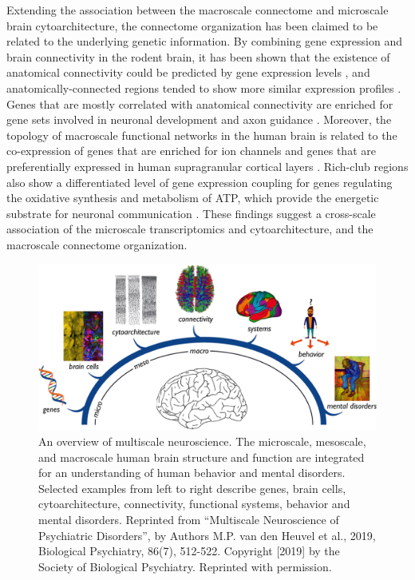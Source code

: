 \begin{refsection}
Extending the association between the macroscale connectome and microscale brain cytoarchitecture, the connectome organization has been claimed to be related to the underlying genetic information. By combining gene expression and brain connectivity in the rodent brain, it has been shown that the existence of anatomical connectivity could be predicted by gene expression levels \citep{Wolf2011GeneEI}, and anatomically-connected regions tended to show more similar expression profiles \citep{French2011RelationshipsBG}. Genes that are mostly correlated with anatomical connectivity are enriched for gene sets involved in neuronal development and axon guidance \citep{French2011RelationshipsBG}. Moreover, the topology of macroscale functional networks in the human brain is related to the co-expression of genes that are enriched for ion channels \citep{richiardi2015correlated} and genes that are preferentially expressed in human supragranular cortical layers \citep{krienen2016transcriptional}. Rich-club regions also show a differentiated level of gene expression coupling for genes regulating the oxidative synthesis and metabolism of ATP, which provide the energetic substrate for neuronal communication \citep{Fulcher2016ATS}. These findings suggest a cross-scale association of the microscale transcriptomics and cytoarchitecture, and the macroscale connectome organization.

\begin{figure}[h]
    \centering
    \includegraphics[width=\linewidth]{images/introFig1.jpg}
    \caption{An overview of multiscale neuroscience. The microscale, mesoscale, and macroscale human brain structure and function are integrated for an understanding of human behavior and mental disorders. Selected examples from left to right describe genes, brain cells, cytoarchitecture, connectivity, functional systems, behavior and mental disorders. Reprinted from “Multiscale Neuroscience of Psychiatric Disorders”, by Authors M.P. van den Heuvel et al., 2019, Biological Psychiatry, 86(7), 512-522. Copyright [2019] by the Society of Biological Psychiatry. Reprinted with permission.}
    \label{introFig1}
\end{figure}



\end{refsection}
